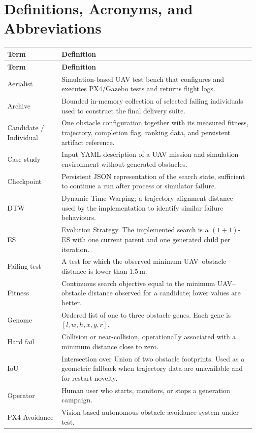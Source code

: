 \documentclass[11pt,a4paper]{report}
\begin{document}
\section{Definitions, Acronyms, and Abbreviations}
\begin{longtable}{L{3.3cm} L{11.5cm}}
\toprule
\textbf{Term} & \textbf{Definition}\\
\midrule
\endfirsthead
\toprule
\textbf{Term} & \textbf{Definition}\\
\midrule
\endhead
Aerialist & Simulation-based UAV test bench that configures and executes PX4/Gazebo tests and returns flight logs.\\
Archive & Bounded in-memory collection of selected failing individuals used to construct the final delivery suite.\\
Candidate / Individual & One obstacle configuration together with its measured fitness, trajectory, completion flag, ranking data, and persistent artifact reference.\\
Case study & Input YAML description of a UAV mission and simulation environment without generated obstacles.\\
Checkpoint & Persistent JSON representation of the search state, sufficient to continue a run after process or simulator failure.\\
DTW & Dynamic Time Warping; a trajectory-alignment distance used by the implementation to identify similar failure behaviours.\\
ES & Evolution Strategy. The implemented search is a $(1+1)$-ES with one current parent and one generated child per iteration.\\
Failing test & A test for which the observed minimum UAV--obstacle distance is lower than $1.5\,\mathrm{m}$.\\
Fitness & Continuous search objective equal to the minimum UAV--obstacle distance observed for a candidate; lower values are better.\\
Genome & Ordered list of one to three obstacle genes. Each gene is $[l,w,h,x,y,r]$.\\
Hard fail & Collision or near-collision, operationally associated with a minimum distance close to zero.\\
IoU & Intersection over Union of two obstacle footprints. Used as a geometric fallback when trajectory data are unavailable and for restart novelty.\\
Operator & Human user who starts, monitors, or stops a generation campaign.\\
PX4-Avoidance & Vision-based autonomous obstacle-avoidance system under test.\\

\end{longtable}
\end{document}
